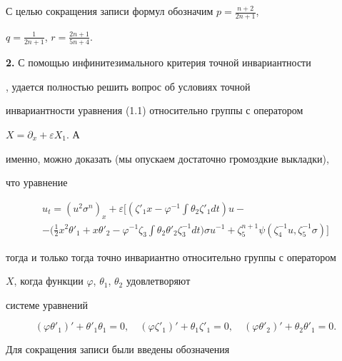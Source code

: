  


С целью сокращения записи формул обозначим $p=\frac{n+2}{2n+1}$, 


$q=\frac{1}{2n+1}$, $r=\frac{2n+1}{5n+4}$. 


\medskip 


 


{\bf 2.} С помощью инфинитезимального критерия точной инвариантности 


\cite{3}, \cite{4} удается полностью решить вопрос об условиях точной 


инвариантности уравнения (1.1) относительно группы с оператором 


$X=\partial_x+\varepsilon X_1$. А 


именно, можно доказать (мы опускаем достаточно громоздкие выкладки), 


что уравнение 


\begin{multline} 


u_t=(u^2\sigma^n)_x+\varepsilon\bigg[(\zeta'_1x-\varphi^{-1}\int 


\theta_2\zeta'_1dt)u- \\ 


-\bigg(\frac{1}{2}x^2\theta'_1+x\theta'_2-\varphi^{-1}\zeta_3 


\int \theta_2\theta'_2\zeta^{-1}_3dt\bigg) 


\sigma u^{-1}+\zeta^{n+1}_5\psi(\zeta^{-1}_4u,\zeta^{-1}_5\sigma) 


\bigg] \tag{2.1} 


\end{multline} 


тогда и только тогда точно инвариантно относительно группы с оператором 


$X$, когда функции $\varphi$, $\theta_1$, $\theta_2$ удовлетворяют 


системе уравнений 


\begin{equation} 


(\varphi\theta'_1)'+\theta'_1\theta_1=0,\quad 


(\varphi\zeta'_1)'+\theta_1\zeta'_1=0,\quad 


(\varphi\theta'_2)'+\theta_2\theta'_1=0. \tag{2.2} 


\end{equation} 


Для сокращения записи были введены обозначения 


$$ 


